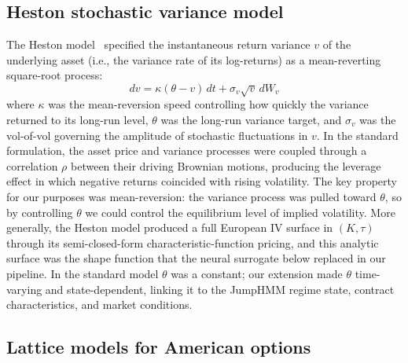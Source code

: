 \subsection{Heston stochastic variance model}

The Heston model~\cite{heston1993} specified the instantaneous return variance $v$ of the underlying asset (i.e., the variance rate of its log-returns) as a mean-reverting square-root process:
\begin{equation}\label{eq:heston_standard}
    dv = \kappa(\theta - v)\,dt + \sigma_v \sqrt{v}\,dW_v
\end{equation}
where $\kappa$ was the mean-reversion speed controlling how quickly the variance returned to its long-run level, $\theta$ was the long-run variance target, and $\sigma_v$ was the vol-of-vol governing the amplitude of stochastic fluctuations in $v$. In the standard formulation, the asset price and variance processes were coupled through a correlation $\rho$ between their driving Brownian motions, producing the leverage effect in which negative returns coincided with rising volatility. The key property for our purposes was mean-reversion: the variance process was pulled toward $\theta$, so by controlling $\theta$ we could control the equilibrium level of implied volatility. More generally, the Heston model produced a full European IV surface in $(K,\tau)$ through its semi-closed-form characteristic-function pricing, and this analytic surface was the shape function that the neural surrogate below replaced in our pipeline. In the standard model $\theta$ was a constant; our extension made $\theta$ time-varying and state-dependent, linking it to the JumpHMM regime state, contract characteristics, and market conditions.

\subsection{Lattice models for American options}

